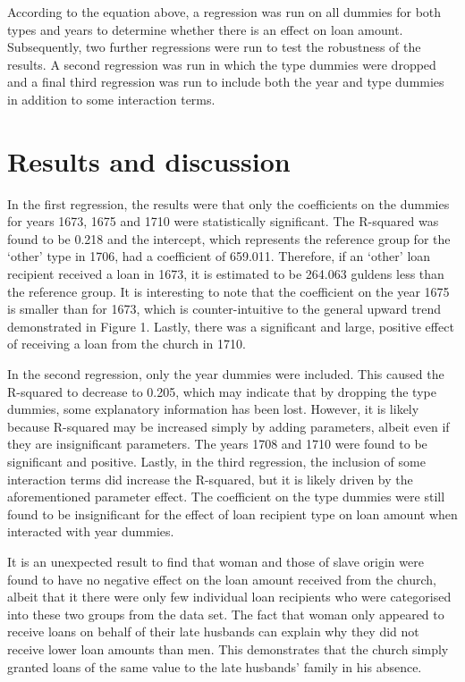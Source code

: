 \documentclass[11pt,preprint, authoryear]{elsarticle}
\numberwithin{equation}{section}
\numberwithin{figure}{section}
\numberwithin{table}{section}
\begin{document}
According to the equation above, a regression was run on all dummies for
both types and years to determine whether there is an effect on loan
amount. Subsequently, two further regressions were run to test the
robustness of the results. A second regression was run in which the type
dummies were dropped and a final third regression was run to include
both the year and type dummies in addition to some interaction terms.

\hypertarget{results-and-discussion}{%
\section{\texorpdfstring{Results and discussion
\label{Discussion}}{Results and discussion }}\label{results-and-discussion}}

In the first regression, the results were that only the coefficients on
the dummies for years 1673, 1675 and 1710 were statistically
significant. The R-squared was found to be 0.218 and the intercept,
which represents the reference group for the `other' type in 1706, had a
coefficient of 659.011. Therefore, if an `other' loan recipient received
a loan in 1673, it is estimated to be 264.063 guldens less than the
reference group. It is interesting to note that the coefficient on the
year 1675 is smaller than for 1673, which is counter-intuitive to the
general upward trend demonstrated in Figure 1. Lastly, there was a
significant and large, positive effect of receiving a loan from the
church in 1710.

In the second regression, only the year dummies were included. This
caused the R-squared to decrease to 0.205, which may indicate that by
dropping the type dummies, some explanatory information has been lost.
However, it is likely because R-squared may be increased simply by
adding parameters, albeit even if they are insignificant parameters. The
years 1708 and 1710 were found to be significant and positive. Lastly,
in the third regression, the inclusion of some interaction terms did
increase the R-squared, but it is likely driven by the aforementioned
parameter effect. The coefficient on the type dummies were still found
to be insignificant for the effect of loan recipient type on loan amount
when interacted with year dummies.

It is an unexpected result to find that woman and those of slave origin
were found to have no negative effect on the loan amount received from
the church, albeit that it there were only few individual loan
recipients who were categorised into these two groups from the data set.
The fact that woman only appeared to receive loans on behalf of their
late husbands can explain why they did not receive lower loan amounts
than men. This demonstrates that the church simply granted loans of the
same value to the late husbands' family in his absence.
\end{document}
